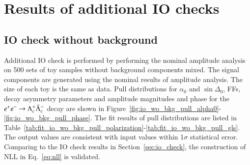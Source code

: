 \clearpage
\section{Results of additional IO checks}
\label{app:IO_results}
\subsection{IO check without background}

Additional IO check is performed by performing the nominal amplitude analysis on 500 sets of toy samples without background components mixed. The signal components are generated using the nominal results of amplitude analysis. The size of each toy is the same as data. Pull distributions for $\alpha_0$ and $\sin\Delta_0$, FFs, decay asymmetry parameters and amplitude magnitudes and phase for the $e^+e^-\rightarrow\Lambda_{c}^{+}\bar{\Lambda}_{c}^{-}$ decay are shown in Figure~\ref{fig:io_wo_bkg_pull_alpha0}-\ref{fig:io_wo_bkg_pull_phase}. The fit results of pull distributions are listed in Table~\ref{tab:fit_io_wo_bkg_pull_polarization}-\ref{tab:fit_io_wo_bkg_pull_gls}. The output values are consistent with input values within 1$\sigma$ statistical error.
Comparing to the IO check results in Section~\ref{sec:io_check}, the construction of NLL in Eq.~\ref{eq:nll} is validated.

